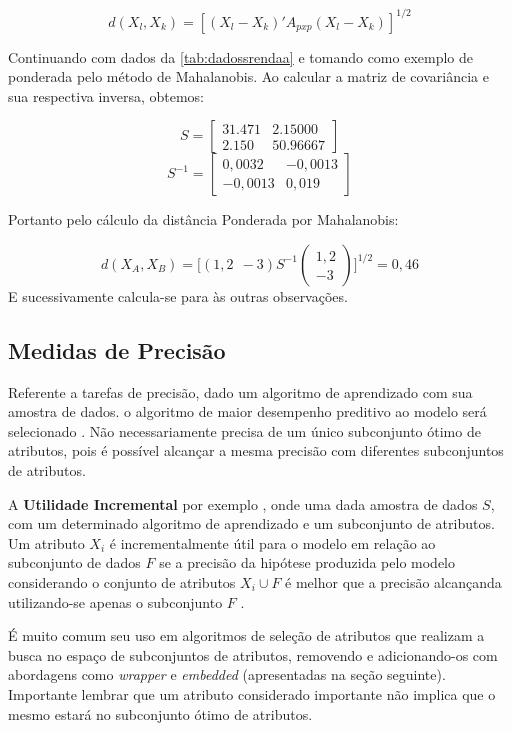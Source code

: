 \documentclass[
  openany]{book}
\begin{document}
\begin{equation} 
  d(X_l,X_k)=[(X_l-X_k)'A_{pxp}(X_l - X_k)]^{1/2}
  \label{eq:distpond}
\end{equation}

Continuando com dados da \ref{tab:dadossrendaa} e tomando como exemplo de ponderada pelo método de Mahalanobis. Ao calcular a matriz de covariância e sua respectiva inversa, obtemos:

\[S=
\begin{bmatrix}
31.471& 2.15000 \\
2.150& 50.96667 
\end{bmatrix}\]
\[S^{-1}=
\begin{bmatrix}
0,0032& -0,0013 \\
-0,0013& 0,019 
\end{bmatrix}\]

Portanto pelo cálculo da distância Ponderada por Mahalanobis:

\[d(X_A,X_B)=\bigg[(1,2 \ \ -3) S^{-1} \begin{pmatrix} 1,2 \\ -3  \end{pmatrix} \bigg]^{1/2}=0,46\]
E sucessivamente calcula-se para às outras observações.

\hypertarget{medidas-de-precisuxe3o}{%
\subsection{Medidas de Precisão}\label{medidas-de-precisuxe3o}}

Referente a tarefas de precisão, dado um algoritmo de aprendizado com sua amostra de dados. o algoritmo de maior desempenho preditivo ao modelo será selecionado \citep{kohavi1997wrappers}. Não necessariamente precisa de um único subconjunto ótimo de atributos, pois é possível alcançar a mesma precisão com diferentes subconjuntos de atributos.

A \textbf{Utilidade Incremental} por exemplo \citep{caruana1994useful}, onde uma dada amostra de dados \(S\), com um determinado algoritmo de aprendizado e um subconjunto de atributos. Um atributo \(X_i\) é incrementalmente útil para o modelo em relação ao subconjunto de dados \(F\) se a precisão da hipótese produzida pelo modelo considerando o conjunto de atributos \(X_i \cup F\) é melhor que a precisão alcançanda utilizando-se apenas o subconjunto \(F\) \citep{lee2005seleccao}.

É muito comum seu uso em algoritmos de seleção de atributos que realizam a busca no espaço de subconjuntos de atributos, removendo e adicionando-os com abordagens como \emph{wrapper} e \emph{embedded} (apresentadas na seção seguinte). Importante lembrar que um atributo considerado importante não implica que o mesmo estará no subconjunto ótimo de atributos.
\end{document}
